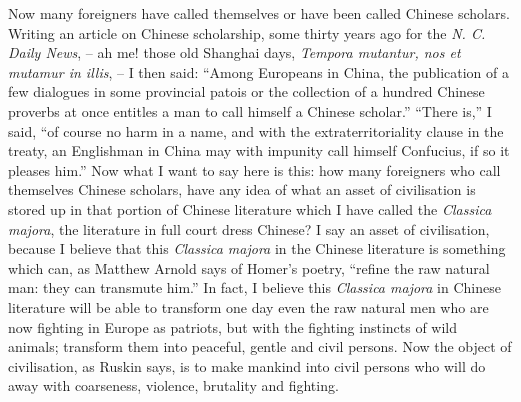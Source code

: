 Now many foreigners have called themselves or have been called Chinese scholars.
Writing an article on Chinese scholarship, some thirty years ago for the \emph{N. C. Daily News},
-- ah me! those old Shanghai days, \emph{Tempora mutantur, nos et mutamur in illis},
-- I then said:
``Among Europeans in China, the publication of a few dialogues in some provincial patois or the collection of a hundred Chinese proverbs at once entitles a man to call himself a Chinese scholar.''
``There is,'' I said,
``of course no harm in a name, and with the extraterritoriality clause in the treaty,
an Englishman in China may with impunity call himself Confucius,
if so it pleases him.''
Now what I want to say here is this: how many foreigners who call themselves Chinese scholars,
have any idea of what an asset of civilisation is stored up in that portion of Chinese literature 
which I have called the \emph{Classica majora},
the literature in full court dress Chinese?
I say an asset of civilisation,
because I believe that this \emph{Classica majora} in the Chinese literature is something
which can, as Matthew Arnold says of Homer's poetry,
``refine the raw natural man: they can transmute him.''
In fact, I believe this \emph{Classica majora} in Chinese literature
will be able to transform one day even the raw natural men
who are now fighting in Europe as patriots,
but with the fighting instincts of wild animals;
transform them into peaceful, gentle and civil persons.
Now the object of civilisation,
as Ruskin says, is to make mankind into civil persons who will do away with coarseness,
violence, brutality and fighting.

